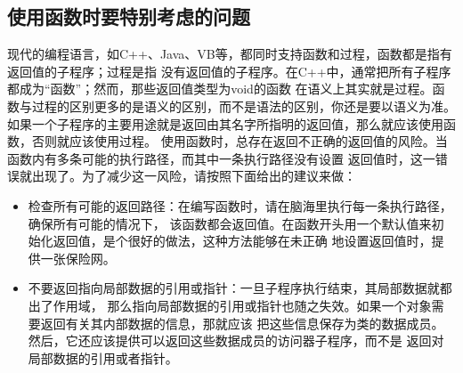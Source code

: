 \documentclass{article}
\begin{document}
\subsection{使用函数时要特别考虑的问题}
现代的编程语言，如C++、Java、VB等，都同时支持函数和过程，函数都是指有返回值的子程序；过程是指
没有返回值的子程序。在C++中，通常把所有子程序都成为“函数”；然而，那些返回值类型为void的函数
在语义上其实就是过程。函数与过程的区别更多的是语义的区别，而不是语法的区别，你还是要以语义为准。
如果一个子程序的主要用途就是返回由其名字所指明的返回值，那么就应该使用函数，否则就应该使用过程。
使用函数时，总存在返回不正确的返回值的风险。当函数内有多条可能的执行路径，而其中一条执行路径没有设置
返回值时，这一错误就出现了。为了减少这一风险，请按照下面给出的建议来做：
\begin{itemize}
    \item 检查所有可能的返回路径：在编写函数时，请在脑海里执行每一条执行路径，确保所有可能的情况下，
    该函数都会返回值。在函数开头用一个默认值来初始化返回值，是个很好的做法，这种方法能够在未正确
    地设置返回值时，提供一张保险网。
    \item 不要返回指向局部数据的引用或指针：一旦子程序执行结束，其局部数据就都出了作用域，
    那么指向局部数据的引用或指针也随之失效。如果一个对象需要返回有关其内部数据的信息，那就应该
    把这些信息保存为类的数据成员。然后，它还应该提供可以返回这些数据成员的访问器子程序，而不是
    返回对局部数据的引用或者指针。
\end{itemize}
\end{document}
